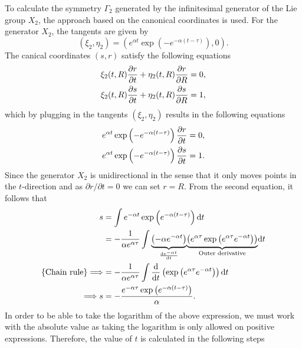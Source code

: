 To calculate the symmetry $\Gamma_2$ generated by the infinitesimal generator of the Lie group $X_2$, the approach based on the canonical coordinates is used. For the generator $X_2$, the tangents are given by
$$\left(\xi_2,\eta_2\right)=\left(e^{\alpha t}\exp\left(-e^{-\alpha(t-\tau)}\right),0\right).$$
The canical coordinates $(s,r)$ satisfy the following equations 
\begin{align*}
\xi_{2}(t,R)\pdv{r}{t}+\eta_{2}(t,R)\pdv{r}{R}&=0,\\
\xi_{2}(t,R)\pdv{s}{t}+\eta_{2}(t,R)\pdv{s}{R}&=1,\\
\end{align*}
which by plugging in the tangents $\left(\xi_2,\eta_2\right)$ results in the following equations
\begin{align*}
e^{\alpha t}\exp\left(-e^{-\alpha(t-\tau)}\right)\pdv{r}{t}&=0,\\
e^{\alpha t}\exp\left(-e^{-\alpha(t-\tau)}\right)\pdv{s}{t}&=1.\\
\end{align*}
Since the generator $X_2$ is unidirectional in the sense that it only moves points in the $t$-direction and as $\partial r/\partial t=0$ we can set $r=R$. From the second equation, it follows that
\begin{align*}
  s&=\int e^{-\alpha t}\exp\left(e^{-\alpha(t-\tau)}\right)\dd t\\
&=-\dfrac{1}{\alpha e^{\alpha\tau}}\int \underset{\dv{e^{-\alpha t}}{t}}{\underbrace{\left(-\alpha e^{-\alpha t}\right)}}\underset{\textrm{Outer derivative}}{\underbrace{\left(e^{\alpha\tau}\exp\left(e^{\alpha\tau}e^{-\alpha t}\right)\right)}}\dd t\\
\{\textrm{Chain rule}\}\Longrightarrow&= -\dfrac{1}{\alpha e^{\alpha\tau}}\int \dv{}{t}\left(\exp\left(e^{\alpha\tau}e^{-\alpha t}\right)\right)\dd t\\
  \Longrightarrow s&=-\dfrac{e^{-\alpha\tau}\exp\left(e^{-\alpha(t-\tau)}\right)}{\alpha}.
\end{align*}
In order to be able to take the logarithm of the above expression, we must work with the absolute value as taking the logarithm is only allowed on positive expressions. Therefore, the value of $t$ is calculated in the following steps


